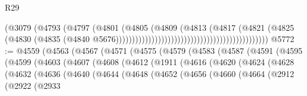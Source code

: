 \begin{lexlean}{R29}
\begin{coremodule}
                                                                        (@3079
                                                                          (@4793
                                                                            (@4797
                                                                              (@4801
                                                                                (@4805
                                                                                  (@4809
                                                                                    (@4813
                                                                                      (@4817
                                                                                        (@4821
                                                                                          (@4825
                                                                                            (@4830
                                                                                              (@4835
                                                                                                (@4840
                                                                                                  @5676)))))))))))))))))))))))))))))))))))))))))))))))
@5772 := @4559
    (@4563
      (@4567
        (@4571
          (@4575
            (@4579
              (@4583
                (@4587
                  (@4591
                    (@4595
                      (@4599
                        (@4603
                          (@4607
                            (@4608
                              (@4612
                                (@1911
                                  (@4616
                                    (@4620
                                      (@4624
                                        (@4628
                                          (@4632
                                            (@4636
                                              (@4640
                                                (@4644
                                                  (@4648
                                                    (@4652
                                                      (@4656
                                                        (@4660
                                                          (@4664
                                                            (@2912
                                                              (@2922
                                                                (@2933

\end{coremodule}
\end{lexlean}
